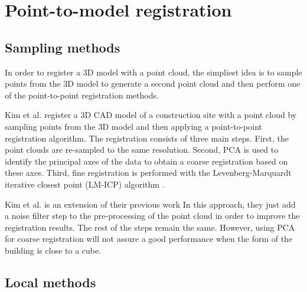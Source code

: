    \section{Point-to-model registration}

        \subsection{Sampling methods}

        In order to register a 3D model with a point cloud, the simpliest idea is to sample points from the 3D model to generate a second point cloud
        and then perform one of the point-to-point registration methods. 

        Kim et al. \cite{Kim_2011_fully} register a 3D CAD model of a construction site with a point cloud by sampling points from the 3D model 
        and then applying a point-to-point registration algorithm. The registration consists of three main steps. First, 
        the point clouds are re-sampled to the same resolution. Second, PCA is used to identify the principal axes of the data 
        to obtain a coarse registration based on these axes. Third, fine registration is performed with the Levenberg-Marquardt
        iterative closest point (LM-ICP) algorithm \cite{Fitzgibbon_2003_robust}. 
        
        Kim et al. \cite{Kim_2013_fully} is an extension of their previous work \cite{Kim_2011_fully}
        In this approach, they just add a noise filter step to the pre-processing of the point cloud in order to improve the registration results.
        The rest of the steps remain the same.
        However, using PCA for coarse registration will not assure a good performance when the form of the building is close to a cube.
        
        \subsection{Local methods}

